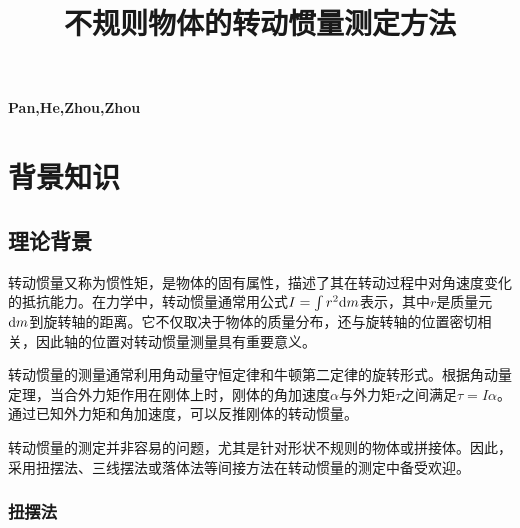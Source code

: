 \documentclass[12pt,hyperref,a4paper,UTF8]{ctexart}
\begin{document}
\cover

%
%

\thispagestyle{empty} %

\newpage
\tableofcontents
\thispagestyle{empty}
\paragraph{}
\newpage


\begin{center}
    \title{ \Huge \textbf{{不规则物体的转动惯量测定方法}}}
\end{center}
\par
\begin{center}
    \textbf{Pan,He,Zhou,Zhou}
\end{center}
\paragraph{}

\section{背景知识}
\subsection{理论背景}

转动惯量又称为惯性矩，是物体的固有属性，描述了其在转动过程中对角速度变化的抵抗能力。在力学中，转动惯量通常用公式$I=\int r^2\text dm$表示，其中$r$是质量元$\text dm$到旋转轴的距离。它不仅取决于物体的质量分布，还与旋转轴的位置密切相关，因此轴的位置对转动惯量测量具有重要意义。

转动惯量的测量通常利用角动量守恒定律和牛顿第二定律的旋转形式。根据角动量定理，当合外力矩作用在刚体上时，刚体的角加速度$\alpha$与外力矩$\tau$之间满足$\tau=I\alpha$。通过已知外力矩和角加速度，可以反推刚体的转动惯量。

转动惯量的测定并非容易的问题，尤其是针对形状不规则的物体或拼接体。因此，采用扭摆法、三线摆法或落体法等间接方法在转动惯量的测定中备受欢迎。

\subsubsection{扭摆法}
\end{document}
